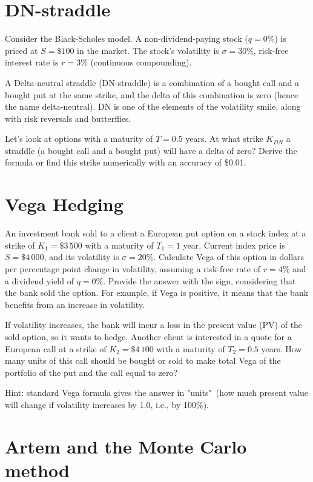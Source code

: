 \documentclass[a4paper,14pt]{extarticle}
\begin{document}
\section{DN-straddle}

Consider the Black-Scholes model. A non-dividend-paying stock ($q= 0\%$) is priced at $S=\$100$ in the market. The stock's volatility is $\sigma= 30\%$, risk-free interest rate is $r= 3\%$ (continuous compounding).

A Delta-neutral straddle (DN-straddle) is a combination of a bought call and a bought put at the same strike, and the delta of this combination is zero (hence the name delta-neutral). DN is one of the elements of the volatility smile, along with risk reversals and butterflies.

Let's look at options with a maturity of $T= 0.5$ years. At what strike $K_{DN}$ a straddle (a bought call and a bought put) will have a delta of zero? Derive the formula or find this strike numerically with an accuracy of \$0.01.

\section{Vega Hedging}

An investment bank sold to a client a European put option on a stock index at a strike of $K_1=\$3\,500$ with a maturity of $T_1=1$ year. Current index price is $S=\$4\,000$, and its volatility is $\sigma=20\%$. Calculate Vega of this option in dollars per percentage point change in volatility, assuming a risk-free rate of $r=4\%$ and a dividend yield of $q=0\%$. Provide the answer with the sign, considering that the bank sold the option. For example, if Vega is positive, it means that the bank benefits from an increase in volatility.

If volatility increases, the bank will incur a loss in the present value (PV) of the sold option, so it wants to hedge. Another client is interested in a quote for a European call at a strike of $K_2=\$4\,100$ with a maturity of $T_2=0.5$ years. How many units of this call should be bought or sold to make total Vega of the portfolio of the put and the call equal to zero?

Hint: standard Vega formula gives the answer in "units"\ (how much present value will change if volatility increases by 1.0, i.e., by 100\%).

\section{Artem and the Monte Carlo method}
\end{document}
